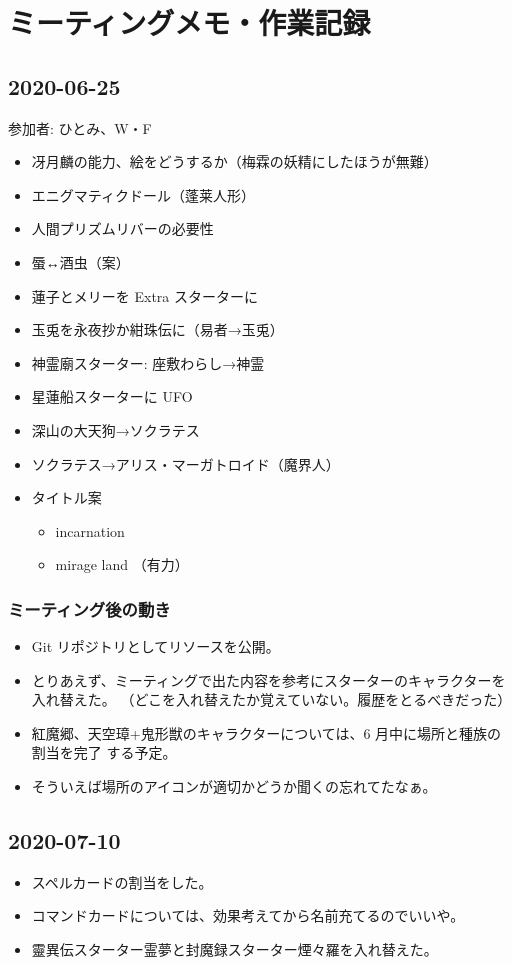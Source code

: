 \documentclass[line_length=22zw,number_of_lines=45,twocolumn]{jlreq}
\begin{document}
\section{ミーティングメモ・作業記録}
\subsection{2020-06-25}
参加者: ひとみ、W・F
\begin{itemize}
	\item 冴月麟の能力、絵をどうするか（梅霖の妖精にしたほうが無難）
	\item エニグマティクドール（蓬莱人形）
	\item 人間プリズムリバーの必要性
	\item 蜃↔酒虫（案）
	\item 蓮子とメリーを Extra スターターに
	\item 玉兎を永夜抄か紺珠伝に（易者→玉兎）
	\item 神霊廟スターター: 座敷わらし→神霊
	\item 星蓮船スターターに UFO
	\item 深山の大天狗→ソクラテス
	\item ソクラテス→アリス・マーガトロイド（魔界人）
	\item タイトル案
		\begin{itemize}
			\item incarnation
			\item mirage land （有力）
		\end{itemize}
\end{itemize}

\subsubsection*{ミーティング後の動き}
\begin{itemize}
	\item Git リポジトリとしてリソースを公開。
	\item とりあえず、ミーティングで出た内容を参考にスターターのキャラクターを入れ替えた。
		（どこを入れ替えたか覚えていない。履歴をとるべきだった）
	\item 紅魔郷、天空璋+鬼形獣のキャラクターについては、6 月中に場所と種族の割当を完了
		する予定。
	\item そういえば場所のアイコンが適切かどうか聞くの忘れてたなぁ。
\end{itemize}

\subsection{2020-07-10}
\begin{itemize}
	\item スペルカードの割当をした。
	\item コマンドカードについては、効果考えてから名前充てるのでいいや。
	\item 靈異伝スターター霊夢と封魔録スターター煙々羅を入れ替えた。
\end{itemize}
\end{document}
